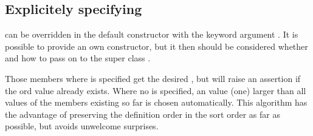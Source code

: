 \documentclass[letterpaper,10pt,english]{sphinxmanual}
\begin{document}
\subsection{Explicitely specifying }
\label{\detokenize{enums:explicitely-specifying-ord}}
\sphinxAtStartPar
{} can be overridden in the default constructor with the
keyword argument . It is possible to provide an own
constructor, but it then should be considered whether and how to pass
on  to the super class {\hyperref[\detokenize{enums:greenland.base.enums.Enum}]{}}.
\def\sphinxLiteralBlockLabel{\label{\detokenize{enums:id10}}}
\begin{sphinxVerbatim}[commandchars=\\\{\}]
 

                  
     
              
     

\end{sphinxVerbatim}

\sphinxAtStartPar
Those members where  is specified get the desired
, but will raise an assertion if the ord value already
exists. Where no  is specified, an  value (one)
larger than all  values of the members existing so far
is chosen automatically. This algorithm has the advantage of
preserving the definition order in the sort order as far as possible,
but avoids unwelcome surprises.
\def\sphinxLiteralBlockLabel{\label{\detokenize{enums:id11}}}
\begin{sphinxVerbatim}[commandchars=\\\{\}]
   
   
   
   
\end{sphinxVerbatim}
\end{document}
